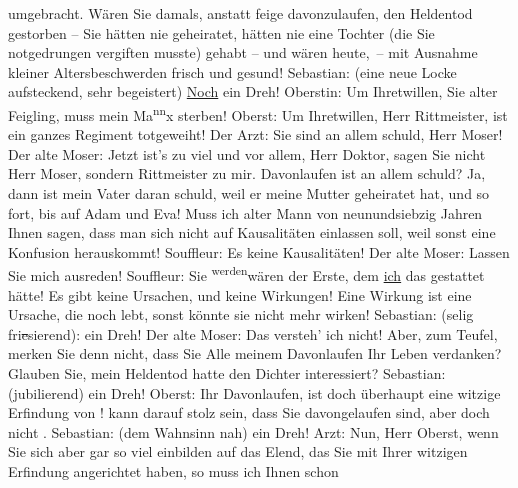 \documentclass[twoside=false,titlepage=false,open=any, parskip=never, fontsize=12pt, headings=small, chapterprefix=false, appendixprefix=false]{scrbook}
\newcommand{\strikeout}[1]{\sout{#1}}
\newcommand{\Theight}{\dimexpr\fontcharht\font`W}
\newcommand{\pbposition}{\depth}
\newcommand{\pb}{\nobreak\hspace{0pt}\raisebox{-0.1em}{\raisebox{\pbposition}{\textnormal{|}}}\nobreak\hspace{0pt}}
\newcommand{\substVorne}{\textnormal{\raisebox{\Theight}{\raisebox{-\height}{\rotatebox[origin=c]{180}{v}\normalsize}}}}
\newcommand{\substDazwischen}{}
\newcommand{\substHinten}{\textnormal{\raisebox{\Theight}{\raisebox{-\height}{\small{v}\normalsize}}}}
\begin{document}
					umgebracht. Wären Sie damals, anstatt feige davonzulaufen, den Heldentod
					gestorben – Sie hätten nie geheiratet, hätten nie eine Tochter (die Sie
					notgedrungen vergiften musste) gehabt – und wären heute, – mit Ausnahme kleiner
					Altersbeschwerden frisch und gesund!\pend
           \pstart
           Sebastian: (eine neue Locke aufsteckend, sehr begeistert) \uline{Noch} ein Dreh!\pend
           \pstart
           Oberstin: Um Ihretwillen, Sie alter Feigling, muss mein Ma\substVorne{}\textsuperscript{nn}\substDazwischen{}x\substHinten{} sterben!\pend
           \pstart
           Oberst: Um Ihretwillen, Herr Rittmeister, ist ein ganzes Regiment totgeweiht!\pend
           \pstart
           Der Arzt: Sie sind an allem schuld, Herr Moser!\pend
           \pstart
           Der alte Moser: Jetzt ist’s zu viel und vor allem, Herr Doktor, sagen Sie nicht
					Herr Moser, sondern Rittmeister zu mir. 
					Davonlaufen ist an allem schuld? Ja, {\pb}dann ist mein Vater daran
					schuld, weil er meine Mutter geheiratet hat, und so fort, bis auf Adam und Eva!
					Muss ich alter Mann von neunundsiebzig Jahren Ihnen sagen, dass man sich nicht
					auf Kausalitäten einlassen soll, weil sonst eine Konfusion herauskommt!\pend
           \pstart
           Souffleur: Es  keine Kausalitäten!\pend
           \pstart
           Der alte Moser: Lassen Sie mich ausreden!\pend
           \pstart
           Souffleur: Sie \substVorne{}\textsuperscript{werden}{\allowbreak}\substDazwischen{}wären\substHinten{} der Erste, dem \uline{ich} das gestattet hätte!
					Es gibt keine Ursachen, und keine Wirkungen! Eine Wirkung ist eine Ursache, die
					noch lebt, sonst könnte sie nicht mehr wirken!\pend
           \pstart
           Sebastian: (selig fri\strikeout{e}sierend):  ein Dreh!\pend
           \pstart
           Der alte Moser: Das versteh’ ich nicht! Aber, zum Teufel, merken Sie denn nicht,
					dass Sie Alle meinem Davonlaufen Ihr Leben verdanken? Glauben Sie, mein
					Heldentod hatte den Dichter interessiert?\pend
           \pstart
           Sebastian: (jubilierend)  ein Dreh!\pend
           \pstart
           Oberst: Ihr Davonlaufen, ist doch überhaupt eine witzige Erfindung von !  kann darauf stolz
					sein, dass Sie davongelaufen sind, aber doch nicht .\pend
           \pstart
           Sebastian: (dem Wahnsinn nah)  ein Dreh!\pend
           \pstart
           Arzt: Nun, Herr Oberst, wenn Sie sich aber gar so viel einbilden auf das Elend,
					das Sie mit Ihrer witzigen Erfindung angerichtet haben, so muss ich Ihnen schon
\end{document}
